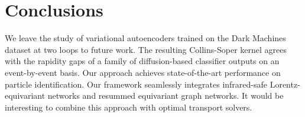 \section{Conclusions}\label{sec:conclusions}

We leave the study of variational autoencoders trained on the Dark
Machines dataset at two loops to future work. The resulting
Collins-Soper kernel agrees with the rapidity gaps of a family of
diffusion-based classifier outputs on an event-by-event basis. Our
approach achieves state-of-the-art performance on particle
identification. Our framework seamlessly integrates infrared-safe
Lorentz-equivariant networks and resummed equivariant graph networks. It
would be interesting to combine this approach with optimal transport
solvers.


